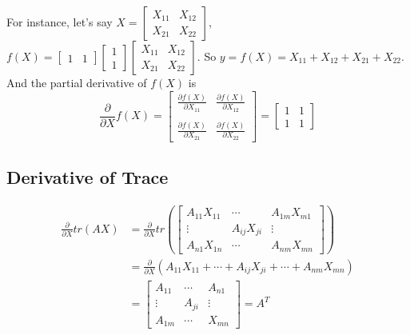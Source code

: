 \documentclass{article}
\begin{document}
For instance, let's say $X=\begin{bmatrix} X_{11}&X_{12}\\X_{21}&X_{22} \end{bmatrix}$,
$f(X)=\begin{bmatrix}1&1\end{bmatrix}\begin{bmatrix}1\\1\end{bmatrix}
\begin{bmatrix} X_{11}&X_{12}\\X_{21}&X_{22} \end{bmatrix}.$
So $y=f(X)=X_{11}+X_{12}+X_{21}+X_{22}.$ And the partial derivative of $f(X)$ is
\begin{equation}
    \frac{\partial}{\partial X}f(X) = 
    \begin{bmatrix} 
        \frac{\partial f(X)}{\partial X_{11}} & \frac{\partial f(X)}{\partial X_{12}} \\ \\
        \frac{\partial f(X)}{\partial X_{21}} & \frac{\partial f(X)}{\partial X_{22}}
     \end{bmatrix}
     =
     \begin{bmatrix} 
        1 & 1 \\
        1 & 1
     \end{bmatrix}
\end{equation}

\subsection{Derivative of Trace}

\begin{equation}
    \begin{aligned}
        \frac{\partial}{\partial X}tr({AX}) &= \frac{\partial}{\partial X} tr(
        \begin{bmatrix}
            A_{11}X_{11} & \cdots & A_{1m}X_{m1} \\
            \vdots & A_{ij}X_{ji} & \vdots \\
            A_{n1}X_{1n} & \cdots & A_{nm}X_{mn}
        \end{bmatrix}) \\
        &= \frac{\partial}{\partial X} 
        (A_{11}X_{11}+\cdots+A_{ij}X_{ji}+\cdots+A_{nm}X_{mn}) \\
        &=
        \begin{bmatrix}
            A_{11} & \cdots & A_{n1} \\
            \vdots & A_{ji} & \vdots \\
            A_{1m} & \cdots & X_{mn}
        \end{bmatrix}=A^T
    \end{aligned}
\end{equation}
\end{document}
